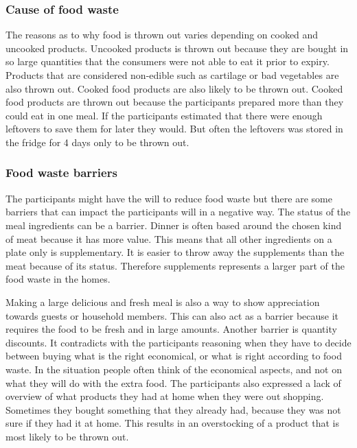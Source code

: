 \subsubsection{Cause of food waste} 
The reasons as to why food is thrown out varies depending on cooked and uncooked products. Uncooked products is thrown out because they are bought in so large quantities that the consumers were not able to eat it prior to expiry. Products that are considered non-edible such as cartilage or bad vegetables are also thrown out. Cooked food products are also likely to be thrown out. Cooked food products are thrown out because the participants prepared more than they could eat in one meal. If the participants estimated that there were enough leftovers to save them for later they would. But often the leftovers was stored in the fridge for 4 days only to be thrown out.

\subsubsection{Food waste barriers}
The participants might have the will to reduce food waste but there are some barriers that can impact the participants will in a negative way. The status  of the meal ingredients can be a barrier. Dinner is often based around the chosen kind of meat because it has more value. This means that all other ingredients on a plate only is supplementary. It is easier to throw away the supplements than the meat because of its status. Therefore supplements represents a larger part of the food waste in the homes.

Making a large delicious and fresh meal is also a way to show appreciation towards guests or household members. This can also act as a barrier because it requires the food to be fresh and in large amounts. Another barrier is quantity discounts. It contradicts with the participants reasoning when they have to decide between buying what is the right economical, or what is right according to food waste. In the situation people often think of the economical aspects, and not on what they will do with the extra food. The participants also expressed a lack of overview of what products they had at home when they were out shopping. Sometimes they bought something that they already had, because they was not sure if they had it at home. This results in an overstocking of a product that is most likely to be thrown out.

